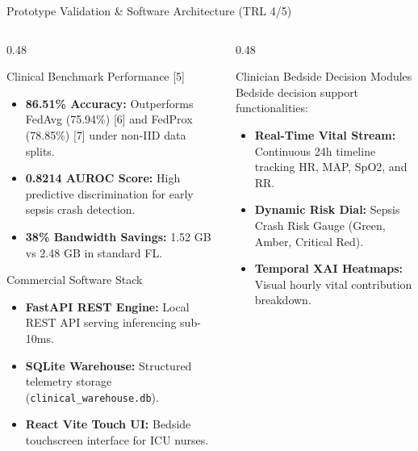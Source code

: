 \documentclass[aspectratio=169, 11pt]{beamer}
\begin{document}
\begin{frame}{Prototype Validation \& Software Architecture (TRL 4/5)}
    \begin{columns}[t]
        \begin{column}{0.48\textwidth}
            \begin{block}{\textcolor{neonCyan}{Clinical Benchmark Performance [5]}}
                \tiny
                \begin{itemize}
                    \item \textbf{86.51\% Accuracy:} Outperforms FedAvg (75.94\%) [6] and FedProx (78.85\%) [7] under non-IID data splits.
                    \item \textbf{0.8214 AUROC Score:} High predictive discrimination for early sepsis crash detection.
                    \item \textbf{38\% Bandwidth Savings:} 1.52 GB vs 2.48 GB in standard FL.
                \end{itemize}
            \end{block}
            
            \begin{block}{\textcolor{neonTeal}{Commercial Software Stack}}
                \tiny
                \begin{itemize}
                    \item \textbf{FastAPI REST Engine:} Local REST API serving inferencing sub-10ms.
                    \item \textbf{SQLite Warehouse:} Structured telemetry storage (\texttt{clinical\_warehouse.db}).
                    \item \textbf{React Vite Touch UI:} Bedside touchscreen interface for ICU nurses.
                \end{itemize}
            \end{block}
        \end{column}
        
        \begin{column}{0.48\textwidth}
            \begin{block}{\textcolor{neonAmber}{Clinician Bedside Decision Modules}}
                \tiny
                Bedside decision support functionalities:
                \begin{itemize}
                    \item \textbf{Real-Time Vital Stream:} Continuous 24h timeline tracking HR, MAP, SpO2, and RR.
                    \item \textbf{Dynamic Risk Dial:} Sepsis Crash Risk Gauge (Green, Amber, Critical Red).
                    \item \textbf{Temporal XAI Heatmaps:} Visual hourly vital contribution breakdown.
                \end{itemize}
            \end{block}


\end{column}
\end{columns}
\end{frame}
\end{document}
